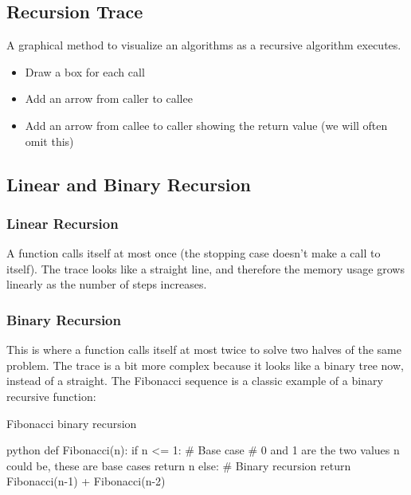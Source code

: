 \subsection{Recursion Trace}\label{sub:recursion_trace}

A graphical method to visualize an algorithms as a recursive algorithm executes.
\begin{itemize}
    \item Draw a box for each call
    \item Add an arrow from caller to callee
    \item Add an arrow from callee to caller showing the return value (we will often omit this)
\end{itemize}

\subsection{Linear and Binary Recursion}\label{sub:linear_and_binary_recursion}

\subsubsection{Linear Recursion}\label{ssub:linear_recursion}

A function calls itself at most once (the stopping case doesn't make a call to itself).
The trace looks like a straight line, and therefore the memory usage grows linearly as the number of steps increases.

\subsubsection{Binary Recursion}\label{ssub:binary_recursion}

This is where a function calls itself at most twice to solve two halves of the same problem.
The trace is a bit more complex because it looks like a binary tree now, instead of a straight. 
The Fibonacci sequence is a classic example of a binary recursive function:
\begin{highlight}{Fibonacci binary recursion}
    \begin{code}{python}
        def Fibonacci(n):
            if n <= 1:  # Base case
            # 0 and 1 are the two values n could be, these are base cases
                return n
            else:  # Binary recursion
                return Fibonacci(n-1) + Fibonacci(n-2)
    \end{code}
\end{highlight}

